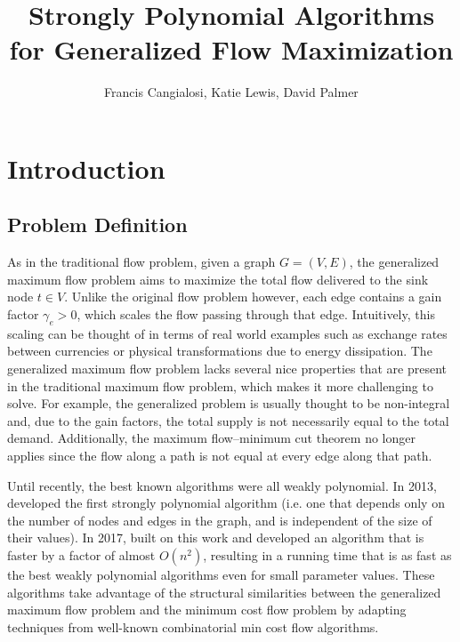 \documentclass[11pt]{article}
\title{Strongly Polynomial Algorithms for Generalized Flow Maximization}
\author{Francis Cangialosi, Katie Lewis, David Palmer}
\date{}
\theoremstyle{definition}
\theoremstyle{definition}
\begin{document}
\maketitle
\section{Introduction}\label{sec:intro}
	\subsection{Problem Definition}\label{sec:problem}
	As in the traditional flow problem, given a
	graph $G = (V,E)$, the generalized maximum flow problem aims to maximize the
	total flow delivered to the sink node $t \in V$. Unlike the original flow
	problem however, each edge contains a gain factor $\gamma_e > 0$, which scales
	the flow passing through that edge. Intuitively, this scaling can be thought
	of in terms of real world examples such as exchange rates between currencies
	or physical transformations due to energy dissipation. The generalized maximum
	flow problem lacks several nice properties that are present in the traditional
	maximum flow problem, which makes it more challenging to solve. For example,
	the generalized problem is usually thought to be non-integral and,
	due to the gain factors, the total supply is not necessarily equal to the total
	demand. Additionally, the maximum flow--minimum cut theorem no longer applies
	since the flow along a path is not equal at every edge along that path.
    
	Until recently, the best known algorithms were all weakly polynomial. In
	2013, \cite{Vegh2013} developed the first strongly polynomial algorithm
	(i.e. one that depends only on the number of nodes and edges in the graph,
	and is independent of the size of their values). In 2017, \cite{Olver2017}
	built on this work and developed an algorithm that is faster by a factor of
	almost $O(n^2)$, resulting in a running time that is as fast as the best
	weakly polynomial algorithms even for small parameter values. These
	algorithms take advantage of the structural similarities between the
	generalized maximum flow problem and the minimum cost flow problem by
	adapting techniques from well-known combinatorial min cost flow algorithms.
    
\end{document}

